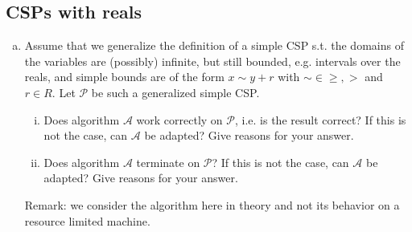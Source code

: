 \subsection{CSPs with reals}

\begin{enumerate}[(d)]
    \item Assume that we generalize the definition of a simple CSP s.t. the domains of the variables are (possibly) infinite, but still bounded, e.g. intervals over the reals, and simple bounds are of the form $x \sim y + r$ with $\sim \in {\geq , >}$ and $r \in R$. Let $\mathcal{P}$ be such a generalized simple CSP.
    \begin{enumerate}[i.]
        \item Does algorithm $\mathcal{A}$ work correctly on $\mathcal{P}$, i.e. is the result correct? If this is not the case, can $\mathcal{A}$ be adapted? Give reasons for your answer.
        \item Does algorithm $\mathcal{A}$ terminate on $\mathcal{P}$? If this is not the case, can $\mathcal{A}$ be adapted? Give reasons for your answer.
    \end{enumerate}
    Remark: we consider the algorithm here in theory and not its behavior on a resource limited machine.
\end{enumerate}


